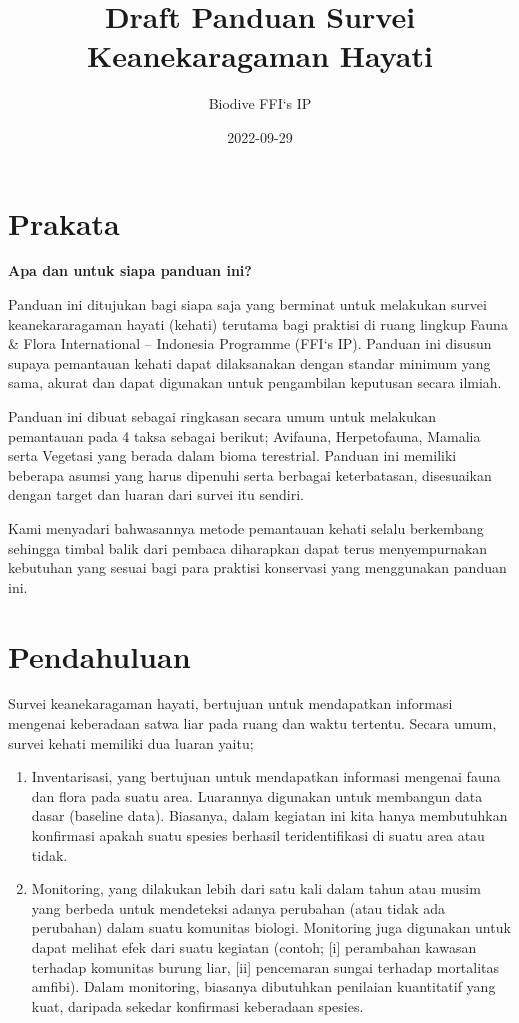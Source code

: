\documentclass[
  oneside]{book}
\title{Draft Panduan Survei Keanekaragaman Hayati}
\author{Biodive FFI`s IP}
\date{2022-09-29}
\begin{document}
\maketitle

{
\setcounter{tocdepth}{4}
\tableofcontents
}
\hypertarget{prakata}{%
\chapter*{Prakata}\label{prakata}}

\textbf{Apa dan untuk siapa panduan ini?}

Panduan ini ditujukan bagi siapa saja yang berminat untuk melakukan survei keanekararagaman hayati (kehati) terutama bagi praktisi di ruang lingkup Fauna \& Flora International -- Indonesia Programme (FFI`s IP). Panduan ini disusun supaya pemantauan kehati dapat dilaksanakan dengan standar minimum yang sama, akurat dan dapat digunakan untuk pengambilan keputusan secara ilmiah.

Panduan ini dibuat sebagai ringkasan secara umum untuk melakukan pemantauan pada 4 taksa sebagai berikut; Avifauna, Herpetofauna, Mamalia serta Vegetasi yang berada dalam bioma terestrial. Panduan ini memiliki beberapa asumsi yang harus dipenuhi serta berbagai keterbatasan, disesuaikan dengan target dan luaran dari survei itu sendiri.

Kami menyadari bahwasannya metode pemantauan kehati selalu berkembang sehingga timbal balik dari pembaca diharapkan dapat terus menyempurnakan kebutuhan yang sesuai bagi para praktisi konservasi yang menggunakan panduan ini.

\hypertarget{pendahuluan}{%
\chapter*{Pendahuluan}\label{pendahuluan}}

Survei keanekaragaman hayati, bertujuan untuk mendapatkan informasi mengenai keberadaan satwa liar pada ruang dan waktu tertentu. Secara umum, survei kehati memiliki dua luaran yaitu;

\begin{enumerate}
\def\labelenumi{(\arabic{enumi})}
\item
  Inventarisasi, yang bertujuan untuk mendapatkan informasi mengenai fauna dan flora pada suatu area. Luarannya digunakan untuk membangun data dasar (baseline data). Biasanya, dalam kegiatan ini kita hanya membutuhkan konfirmasi apakah suatu spesies berhasil teridentifikasi di suatu area atau tidak.
\item
  Monitoring, yang dilakukan lebih dari satu kali dalam tahun atau musim yang berbeda untuk mendeteksi adanya perubahan (atau tidak ada perubahan) dalam suatu komunitas biologi. Monitoring juga digunakan untuk dapat melihat efek dari suatu kegiatan (contoh; {[}i{]} perambahan kawasan terhadap komunitas burung liar, {[}ii{]} pencemaran sungai terhadap mortalitas amfibi). Dalam monitoring, biasanya dibutuhkan penilaian kuantitatif yang kuat, daripada sekedar konfirmasi keberadaan spesies.
\end{enumerate}
\end{document}
